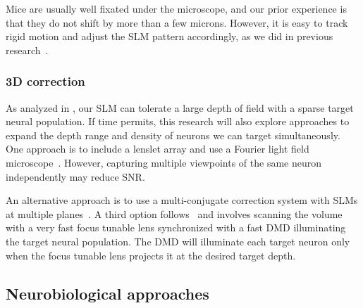 Mice are usually well fixated under the microscope, and our prior experience is that they do not shift by more than a few microns. However, it is easy to track rigid motion and adjust the SLM pattern accordingly, as we did in previous research~\cite{Pegard2016Compressive}.  



\subsubsection{3D correction}
As analyzed in , our SLM can tolerate a large depth of field with a sparse target neural population. If time permits, this research will also explore approaches to expand the depth range and density of neurons we can target simultaneously. One approach is to include a lenslet array and use a Fourier light field microscope~\cite{Pegard2016Compressive,Guo2019Fourier,Galdon2022Fourier}. However, capturing multiple viewpoints of the same neuron independently may reduce SNR.

An alternative approach is to use a multi-conjugate correction system with SLMs at multiple planes~\cite{Thaung:09,Wu:15,Laslandes:17,Furieri23,Kam2007,Simmonds_2013,Wu:15}. A third option follows~\cite{Xiao2018VideoRate} and involves scanning the volume with a very fast focus tunable lens synchronized with a fast DMD illuminating the target neural population. The DMD will illuminate each target neuron only when the focus tunable lens projects it at the desired target depth.


\subsection{Neurobiological approaches }
